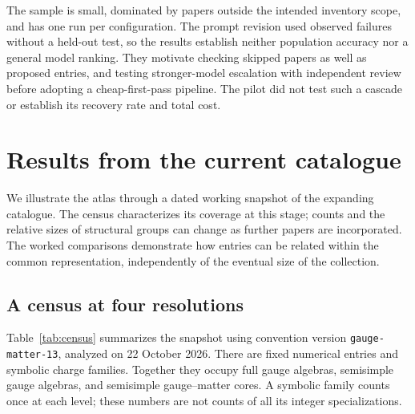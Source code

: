 The sample is small, dominated by papers outside the intended inventory scope, and has one run per configuration. The prompt revision used observed failures without a held-out test, so the results establish neither population accuracy nor a general model ranking. They motivate checking skipped papers as well as proposed entries, and testing stronger-model escalation with independent review before adopting a cheap-first-pass pipeline. The pilot did not test such a cascade or establish its recovery rate and total cost.

\section{Results from the current catalogue}
\label{sec:results}

We illustrate the atlas through a dated working snapshot of the expanding catalogue. The census characterizes its coverage at this stage; counts and the relative sizes of structural groups can change as further papers are incorporated. The worked comparisons demonstrate how entries can be related within the common representation, independently of the eventual size of the collection.

\subsection{A census at four resolutions}

Table~\ref{tab:census} summarizes the snapshot using convention version \texttt{gauge-matter-13}, analyzed on 22 October 2026. There are \AtlasNumerical{} fixed numerical entries and \AtlasFamilies{} symbolic charge families. Together they occupy \AtlasFullAlgebras{} full gauge algebras, \AtlasSemisimpleAlgebras{} semisimple gauge algebras, and \AtlasCores{} semisimple gauge--matter cores. A symbolic family counts once at each level; these numbers are not counts of all its integer specializations.


